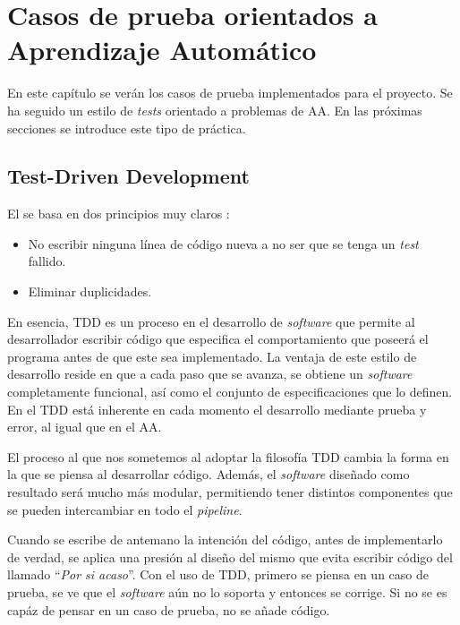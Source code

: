 \chapter{Casos de prueba orientados a Aprendizaje Automático}
\label{ch:tdml}

En este capítulo se verán los casos de prueba implementados para el proyecto. Se
ha seguido un estilo de \emph{tests} orientado a problemas de \ac{AA}. En las próximas
secciones se introduce este tipo de práctica.

\section{Test-Driven Development}
\label{sec:tdd}

El  se basa en dos principios muy claros \cite{Justin2015}:
\begin{itemize}
\item No escribir ninguna línea de código nueva a no ser que se tenga un
  \emph{test} fallido.
\item Eliminar duplicidades.
\end{itemize}

En esencia, \ac{TDD} es un proceso en el desarrollo de \emph{software} que
permite al desarrollador escribir código que especifica el comportamiento que
poseerá el programa antes de que este sea implementado. La ventaja de este
estilo de desarrollo reside en que a cada paso que se avanza, se obtiene un
\emph{software} completamente funcional, así como el conjunto de
especificaciones que lo definen. En el \ac{TDD} está inherente en cada momento
el desarrollo mediante prueba y error, al igual que en el \ac{AA}.

El proceso al que nos sometemos al adoptar la filosofía \ac{TDD} cambia la forma
en la que se piensa al desarrollar código. Además, el \emph{software} diseñado
como resultado será mucho más modular, permitiendo tener distintos componentes
que se pueden intercambiar en todo el \emph{pipeline}.

Cuando se escribe de antemano la intención del código, antes de implementarlo de
verdad, se aplica una presión al diseño del mismo que evita escribir código del
llamado ``\emph{Por si acaso}''. Con el uso de \ac{TDD}, primero se piensa en un
caso de prueba, se ve que el \emph{software} aún no lo soporta y entonces se
corrige. Si no se es capáz de pensar en un caso de prueba, no se añade código.


